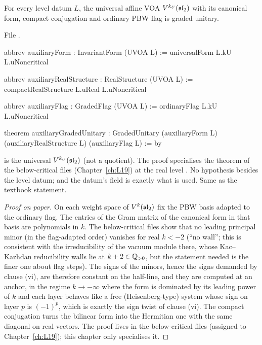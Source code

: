 \begin{theorem}\label{l29:thm:aux}
For every level datum $L$, the universal affine VOA $V^{k_U}(\mathfrak{sl}_2)$ with its canonical form, compact
conjugation and ordinary PBW flag is graded unitary.
\end{theorem}

\noindent File .
\begin{leancode}
abbrev auxiliaryForm : InvariantForm (UVOA L) := universalForm L.kU L.uNoncritical

abbrev auxiliaryRealStructure : RealStructure (UVOA L) :=
  compactRealStructure L.uReal L.uNoncritical

abbrev auxiliaryFlag : GradedFlag (UVOA L) := ordinaryFlag L.kU L.uNoncritical

theorem auxiliaryGradedUnitary :
    GradedUnitary (auxiliaryForm L) (auxiliaryRealStructure L) (auxiliaryFlag L) := by
\end{leancode}

\begin{dictionary}
 is the universal $V^{k_U}(\mathfrak{sl}_2)$ (not a quotient). The proof specialises the theorem
 of the below-critical files (Chapter~\ref{ch:L19}) at the
real level . No hypothesis besides the level datum; and the datum's field  is exactly what
is used. Same as the textbook statement.
\end{dictionary}

\begin{proof}[Proof on paper]
On each weight space of $V^k(\mathfrak{sl}_2)$ fix the PBW basis adapted to the ordinary flag. The entries of the Gram
matrix of the canonical form in that basis are polynomials in $k$. The below-critical files show that no leading
principal minor (in the flag-adapted order) vanishes for real $k<-2$ (``no wall''; this is consistent with the
irreducibility of the vacuum module there, whose Kac--Kazhdan reducibility walls lie at $k+2\in{\mathbb{Q}}_{>0}$, but the
statement needed is the finer one about flag steps). The signs of the minors, hence the signs demanded by
clause (vi), are therefore constant on the half-line, and they are computed at an anchor, in the regime
$k\to-\infty$ where the form is dominated by its leading power of $k$ and each layer behaves like a free
(Heisenberg-type) system whose sign on layer $p$ is $(-1)^p$, which is exactly the sign twist of clause (vi). The
compact conjugation turns the bilinear form into the Hermitian one with the same diagonal on real vectors. The
proof lives in the below-critical files (assigned to Chapter~\ref{ch:L19}); this chapter only specialises it.
\end{proof}

